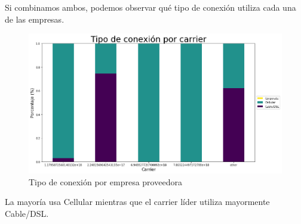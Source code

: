 \documentclass[a4paper, 12pt]{article}
\begin{document}
		Si combinamos ambos, podemos observar qué tipo de conexión utiliza cada una de las empresas.
		
		\FloatBarrier
		\begin{figure}[h]
			\centering
			\includegraphics[width=\textwidth]{images/events/carriersxtipo.png}
			\caption{Tipo de conexión por empresa proveedora}
		\end{figure}
		\FloatBarrier
		
		La mayoría usa Cellular mientras que el carrier líder utiliza mayormente Cable/DSL.
		
\end{document}
